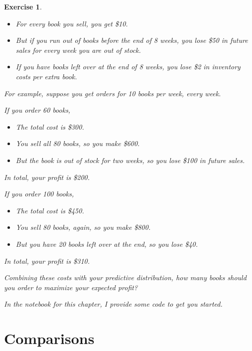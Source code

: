 \documentclass[12pt]{book}
\theoremstyle{exercise}
\newtheorem{exercise}{Exercise}[chapter]
\begin{document}
\begin{exercise}
\begin{itemize}
\item For every book you sell, you get \$10.

\item But if you run out of books before the end of 8 weeks, you lose \$50 in future sales for every week you are out of stock.

\item If you have books left over at the end of 8 weeks, you lose \$2 in inventory costs per extra book.
\end{itemize}

For example, suppose you get orders for 10 books per week, every week.

If you order 60 books,
\begin{itemize}

\item The total cost is \$300.

\item You sell all 80 books, so you make \$600.

\item But the book is out of stock for two weeks, so you lose \$100 in future sales.
\end{itemize}

In total, your profit is \$200.

If you order 100 books,
\begin{itemize}

\item The total cost is \$450.

\item You sell 80 books, again, so you make \$800.

\item But you have 20 books left over at the end, so you lose \$40.
\end{itemize}

In total, your profit is \$310.

Combining these costs with your predictive distribution, how many books should you order to maximize your expected profit?

In the notebook for this chapter, I provide some code to get you started.

\end{exercise}




\chapter{Comparisons}
\label{comparison}
\end{document}
